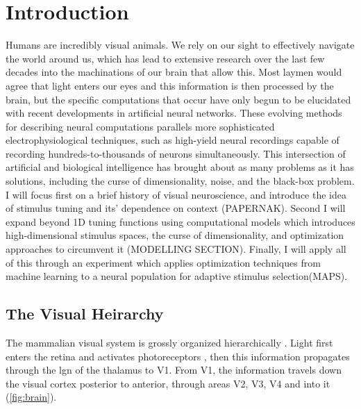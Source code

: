 
\chapter{\color{RoyalBlue!50!black} Introduction} %

\label{ch:intro} %




Humans are incredibly visual animals. We rely on our sight to effectively navigate the world around us, which has lead to extensive research over the last few decades into the machinations of our brain that allow this. Most laymen would agree that light enters our eyes and this information is then processed by the brain, but the specific computations that occur have only begun to be elucidated with recent developments in artificial neural networks. These evolving methods for describing neural computations parallels more sophisticated electrophysiological techniques, such as high-yield neural recordings capable of recording hundreds-to-thousands of neurons simultaneously. This intersection of artificial and biological intelligence has brought about as many problems as it has solutions, including the curse of dimensionality, noise, and the black-box problem. I will focus first on a brief history of visual neuroscience, and introduce the idea of stimulus tuning and its' dependence on context (PAPERNAK). Second I will expand beyond 1D tuning functions using computational models which introduces high-dimensional stimulus spaces, the curse of dimensionality, and optimization approaches to circumvent it (MODELLING SECTION). Finally, I will apply all of this through an experiment which applies optimization techniques from machine learning to a neural population for adaptive stimulus selection(MAPS).

\section{The Visual Heirarchy}
The mammalian visual system is grossly organized hierarchically \citep{Felleman1991, Barone2000, Batardiere2002}. Light first enters the retina and activates photoreceptors \citep{Field2010}, then this information propagates through the \gls{lgn} of the thalamus to V1. From V1, the information travels down the visual cortex posterior to anterior, through areas V2, V3, V4 and into \gls{it} (\ref{fig:brain}). 

